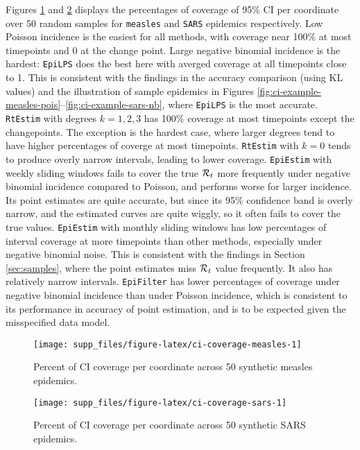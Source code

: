 \documentclass[
]{article}
\begin{document}
Figures \ref{fig:ci-coverage-measles} and \ref{fig:ci-coverage-sars} displays
the percentages of coverage of 95\% CI per coordinate over 50 random samples for
\texttt{measles} and \texttt{SARS} epidemics respectively.
Low Poisson incidence is the easiest for all methods, with coverage near 100\% at most
timepoints and 0 at the change point. Large negative binomial incidence is the hardest:
\texttt{EpiLPS} does the best here with averged coverage at all timepoints close to 1.
This is consistent with the findings in the accuracy comparison (using KL values)
and the illustration of sample epidemics in Figures
\ref{fig:ci-example-measles-pois}--\ref{fig:ci-example-sars-nb}, where
\texttt{EpiLPS} is the most accurate.
\texttt{RtEstim} with degrees \(k=1,2,3\) has 100\% coverage at most timepoints except the
changepoints. The exception is the hardest case, where larger degrees tend to have higher
percentages of coverge at most timepoints.
\texttt{RtEstim} with \(k=0\) tends to produce overly narrow intervals, leading to lower coverage.
\texttt{EpiEstim} with weekly sliding windows fails to cover the true
\(\mathcal{R}_t\) more frequently under negative binomial incidence compared to Poisson,
and performs worse for larger incidence.
Its point estimates are quite accurate, but since its 95\% confidence band is overly
narrow, and the estimated curves are quite wiggly, so it often fails to cover the true values.
\texttt{EpiEstim} with monthly sliding windows has low percentages of interval coverage
at more timepoints than other methods, especially under negative binomial
noise. This is consistent with the findings in Section \ref{sec:samples},
where the point estimates miss \(\mathcal{R}_t\) value frequently. It also has relatively
narrow intervals. \texttt{EpiFilter} has lower percentages of coverage
under negative binomial incidence than under Poisson incidence, which is consistent
to its performance in accuracy of point estimation, and is to be expected given
the misspecified data model.

\begin{figure}[!ht]

{\centering \texttt{[image: supp\_files/figure-latex/ci-coverage-measles-1]} 

}

\caption{Percent of CI coverage per coordinate across 50 synthetic measles epidemics.}\label{fig:ci-coverage-measles}
\end{figure}

\begin{figure}[!ht]

{\centering \texttt{[image: supp\_files/figure-latex/ci-coverage-sars-1]} 

}

\caption{Percent of CI coverage per coordinate across 50 synthetic SARS epidemics.}\label{fig:ci-coverage-sars}
\end{figure}
\end{document}

